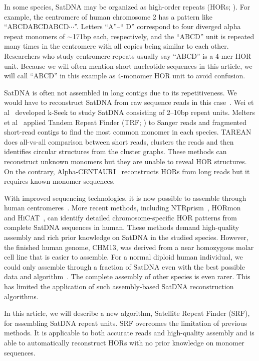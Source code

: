 \documentclass{bioinfo}
\begin{document}
In some species, SatDNA may be organized as high-order repeats
(HORs; \citealt{Miga:2019aa}).  For example, the centromere of human chromosome 2
has a pattern like ``{\sf ABCDABCDABCD$\cdots$}''. Letters ``{\sf A}''--``{\sf
D}'' correspond to four diverged alpha repeat monomers of $\sim$171bp each,
respectively, and the ``{\sf ABCD}'' unit is repeated many times in the
centromere with all copies being similar to each other. Researchers who study
centromere repeats usually say ``{\sf ABCD}'' is a 4-mer HOR unit. Because we
will often mention short nucleotide sequences in this article, we will call
``{\sf ABCD}'' in this example as 4-monomer HOR unit to avoid confusion.

SatDNA is often not assembled in long contigs due to its repetitiveness.
We would have to reconstruct SatDNA from raw sequence reads in this
case~\citep{Lower:2018aa}.  Wei et al~\citep{Wei:2014vl} developed k-Seek to
study SatDNA consisting of 2--10bp repeat units. Melters et
al~\citep{Melters:2013va} applied Tandem Repeat Finder (TRF;
\citealt{Benson:1999aa}) to Sanger reads and fragmented short-read contigs to
find the most common monomer in each species.  TAREAN~\citep{Novak:2017wx} does
all-vs-all comparison between short reads, clusters the reads and then
identifies circular structures from the cluster graphs. These methods can
reconstruct unknown monomers but they are unable to reveal HOR structures. On
the contrary, Alpha-CENTAURI~\citep{Sevim:2016tl} reconstructs HORs from long
reads but it requires known monomer sequences.

With improved sequencing technologies, it is now possible to assemble through
human centromeres~\citep{Nurk:2022up}. More recent methods, including
NTRprism~\citep{Altemose:2022tv}, HORmon~\citep{Kunyavskaya:2022tx} and
HiCAT~\citep{Gao2022.08.07.502881}, can identify detailed
chromosome-specific HOR patterns from complete SatDNA sequences in human. These
methods demand high-quality assembly and rich prior knowledge on SatDNA in the
studied species. However, the finished human genome, CHM13, was derived from a
near homozygous molar cell line that is easier to assemble. For a normal
diploid human individual, we could only assemble through a fraction of SatDNA
even with the best possible data and
algorithm~\citep{Rautiainen:2023aa}. The complete assembly of other
species is even rarer. This has limited the application of such assembly-based
SatDNA reconstruction algorithms.

In this article, we will describe a new algorithm, Satellite Repeat Finder
(SRF), for assembling SatDNA repeat units. SRF overcomes the limitation of
previous methods. It is applicable to both accurate reads and high-quality
assembly and is able to automatically reconstruct HORs with no prior knowledge
on monomer sequences.
\end{document}
